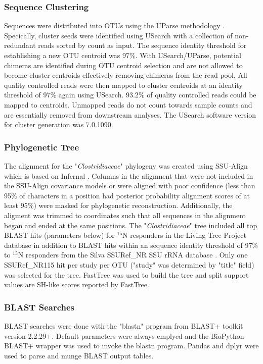 \subsubsection{Sequence Clustering}
Sequences were distributed into OTUs using the UParse methodology \cite{23955772}. Specically, cluster seeds were identified using USearch with a collection of non-redundant reads sorted by count as input. The sequence identity threshold for establishing a new OTU centroid was 97\%. With USearch/UParse, potential chimeras are identified during OTU centroid selection and are not allowed to become cluster centroids effectively removing chimeras from the read pool. All quality controlled reads were then mapped to cluster centroids at an identity threshold of 97\% again using USearch. 93.2\% of quality controlled reads could be mapped to centroids. Unmapped reads do not count towards sample counts and are essentially removed from downstream analyses. The USearch software version for cluster generation was 7.0.1090.

\subsubsection{Phylogenetic Tree}
The alignment for the "\textit{Clostridiaceae}" phylogeny was created using SSU-Align which is based on Infernal \cite{24008419, 19307242}. Columns in the alignment that were not included in the SSU-Align covariance models or were aligned with poor confidence (less than 95\% of characters in a position had posterior probability alignment scores of at least 95\%) were masked for phylogenetic reconstruction. Additionally, the aligment was trimmed to coordinates such that all sequences in the alignment began and ended at the same positions. The "\textit{Clostridiaceae}" tree included all top BLAST hits (parameters below) for $^{15}$N responders in the Living Tree Project database \cite{Yarza_2008} in addition to BLAST hits within an sequence identity threshold of 97\% to $^{15}$N responders from the Silva SSURef\_NR SSU rRNA database \cite{17947321}. Only one SSURef\_NR115 hit per study per OTU ("study" was determined by "title" field) was selected for the tree. FastTree \cite{20224823} was used to build the tree and split support values are SH-like scores reported by FastTree.

\subsubsection{BLAST Searches}
BLAST searches were done with the "blastn" program from BLAST+ toolkit \cite{20003500} version 2.2.29+. Default parameters were always emplyed and the BioPython \cite{19304878} BLAST+ wrapper was used to invoke the blastn program. Pandas \cite{citeulike:11241428} and dplyr \cite{dplyr} were used to parse and munge BLAST output tables.  

